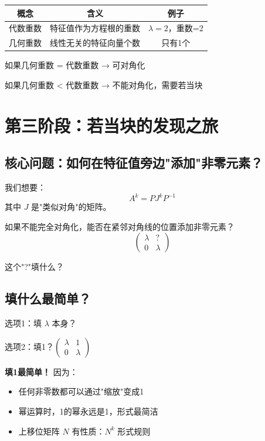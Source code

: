 \documentclass[12pt,a4paper]{article}
\begin{document}
\begin{center}
\begin{tabular}{|c|c|c|}
\hline
概念 & 含义 & 例子 \\
\hline
代数重数 & 特征值作为方程根的重数 & $\lambda=2$，重数=2 \\
\hline
几何重数 & 线性无关的特征向量个数 & 只有1个 \\
\hline
\end{tabular}
\end{center}

如果几何重数 = 代数重数 → 可对角化

如果几何重数 < 代数重数 → 不能对角化，需要若当块

\section{第三阶段：若当块的发现之旅}

\subsection{核心问题：如何在特征值旁边"添加"非零元素？}

我们想要：
\[
A^k = P J^k P^{-1}
\]
其中 $J$ 是"类似对角"的矩阵。

如果不能完全对角化，能否在紧邻对角线的位置添加非零元素？
\[
\begin{pmatrix}
\lambda & ? \\
0 & \lambda
\end{pmatrix}
\]

这个"?"填什么？

\subsection{填什么最简单？}

选项1：填 $\lambda$ 本身？

选项2：填1？$\begin{pmatrix} \lambda & 1 \\ 0 & \lambda \end{pmatrix}$

\textbf{填1最简单！} 因为：
\begin{itemize}
    \item 任何非零数都可以通过"缩放"变成1
    \item 幂运算时，1的幂永远是1，形式最简洁
    \item 上移位矩阵 $N$ 有性质：$N^k$ 形式规则
\end{itemize}
\end{document}
